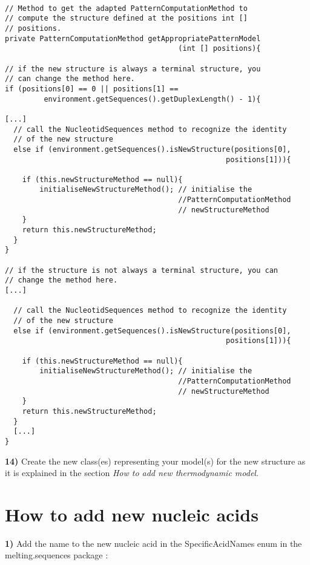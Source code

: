 \documentclass{article}
\begin{document}
\begin{verbatim}

// Method to get the adapted PatternComputationMethod to 
// compute the structure defined at the positions int [] 
// positions.
private PatternComputationMethod getAppropriatePatternModel
                                        (int [] positions){

// if the new structure is always a terminal structure, you 
// can change the method here.
if (positions[0] == 0 || positions[1] == 
         environment.getSequences().getDuplexLength() - 1){

[...]
  // call the NucleotidSequences method to recognize the identity 
  // of the new structure
  else if (environment.getSequences().isNewStructure(positions[0], 
                                                   positions[1])){
  
    if (this.newStructureMethod == null){
		initialiseNewStructureMethod(); // initialise the 
		                                //PatternComputationMethod
		                                // newStructureMethod
	}
	return this.newStructureMethod;
  }
}

// if the structure is not always a terminal structure, you can 
// change the method here.
[...]

  // call the NucleotidSequences method to recognize the identity 
  // of the new structure
  else if (environment.getSequences().isNewStructure(positions[0], 
                                                   positions[1])){
  
    if (this.newStructureMethod == null){
		initialiseNewStructureMethod(); // initialise the 
		                                //PatternComputationMethod
		                                // newStructureMethod
	}
	return this.newStructureMethod;
  }
  [...]
}

\end{verbatim}

\textbf{14)} Create the new class(es) representing your model(s) for the new structure as it is explained
in the section \textit{How to add new thermodynamic model}.

\section{How to add new nucleic acids}

\textbf{1)} Add the name to the new nucleic acid in the SpecificAcidNames enum in the melting.sequences
package :
\end{document}
